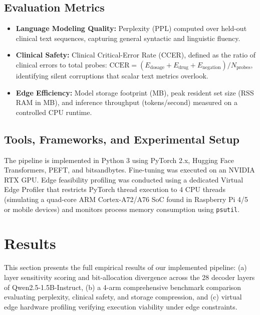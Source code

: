 \documentclass[conference]{IEEEtran}
\begin{document}
\subsection{Evaluation Metrics}
\begin{itemize}
    \item \textbf{Language Modeling Quality:} Perplexity (PPL) computed over held-out clinical text sequences, capturing general syntactic and linguistic fluency.
    \item \textbf{Clinical Safety:} Clinical Critical-Error Rate (CCER), defined as the ratio of clinical errors to total probes: $\text{CCER} = (E_{\text{dosage}} + E_{\text{drug}} + E_{\text{negation}}) / N_{\text{probes}}$, identifying silent corruptions that scalar text metrics overlook.
    \item \textbf{Edge Efficiency:} Model storage footprint (MB), peak resident set size (RSS RAM in MB), and inference throughput (tokens/second) measured on a controlled CPU runtime.
\end{itemize}

\subsection{Tools, Frameworks, and Experimental Setup}
The pipeline is implemented in Python 3 using PyTorch 2.x, Hugging Face Transformers, PEFT, and bitsandbytes. Fine-tuning was executed on an NVIDIA RTX GPU. Edge feasibility profiling was conducted using a dedicated Virtual Edge Profiler that restricts PyTorch thread execution to 4 CPU threads (simulating a quad-core ARM Cortex-A72/A76 SoC found in Raspberry Pi 4/5 or mobile devices) and monitors process memory consumption using \texttt{psutil}.

\section{Results}
This section presents the full empirical results of our implemented pipeline: (a) layer sensitivity scoring and bit-allocation divergence across the 28 decoder layers of Qwen2.5-1.5B-Instruct, (b) a 4-arm comprehensive benchmark comparison evaluating perplexity, clinical safety, and storage compression, and (c) virtual edge hardware profiling verifying execution viability under edge constraints.
\end{document}
